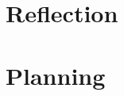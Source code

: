 \documentclass[
	letterpaper, %
]{jdf}
\begin{document}
\section{Reflection}

    
\section{Planning}

\printbibliography{}
\end{document}
